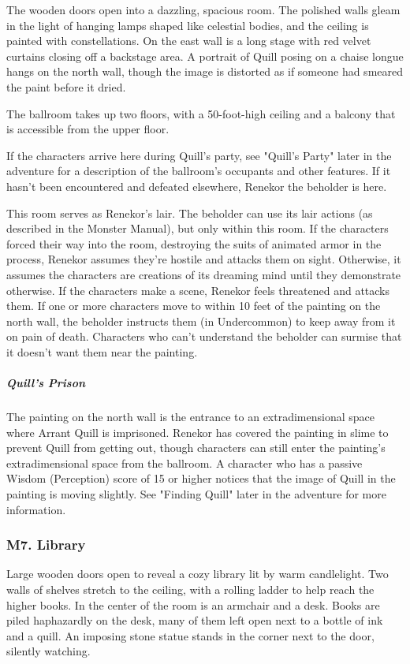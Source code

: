\documentclass[10pt,a4paper,twoside,bg=print,twocolumn,openany,nodeprecatedcode]{dndbook}
\begin{document}
\begin{DndReadAloud}{}
The wooden doors open into a dazzling, spacious room. The polished walls gleam in the light of hanging lamps shaped like celestial bodies, and the ceiling is painted with constellations. On the east wall is a long stage with red velvet curtains closing off a backstage area. A portrait of Quill posing on a chaise longue hangs on the north wall, though the image is distorted as if someone had smeared the paint before it dried.

\end{DndReadAloud}

The ballroom takes up two floors, with a 50-foot-high ceiling and a balcony that is accessible from the upper floor.

If the characters arrive here during Quill's party, see "Quill's Party" later in the adventure for a description of the ballroom's occupants and other features. If it hasn't been encountered and defeated elsewhere, Renekor the beholder is here.

This room serves as Renekor's lair. The beholder can use its lair actions (as described in the Monster Manual), but only within this room. If the characters forced their way into the room, destroying the suits of animated armor in the process, Renekor assumes they're hostile and attacks them on sight. Otherwise, it assumes the characters are creations of its dreaming mind until they demonstrate otherwise. If the characters make a scene, Renekor feels threatened and attacks them. If one or more characters move to within 10 feet of the painting on the north wall, the beholder instructs them (in Undercommon) to keep away from it on pain of death. Characters who can't understand the beholder can surmise that it doesn't want them near the painting.

\subparagraph{Quill's Prison}
The painting on the north wall is the entrance to an extradimensional space where Arrant Quill is imprisoned. Renekor has covered the painting in slime to prevent Quill from getting out, though characters can still enter the painting's extradimensional space from the ballroom. A character who has a passive Wisdom (Perception) score of 15 or higher notices that the image of Quill in the painting is moving slightly. See "Finding Quill" later in the adventure for more information.

\subsubsection{M7. Library}
\begin{DndReadAloud}{}
Large wooden doors open to reveal a cozy library lit by warm candlelight. Two walls of shelves stretch to the ceiling, with a rolling ladder to help reach the higher books. In the center of the room is an armchair and a desk. Books are piled haphazardly on the desk, many of them left open next to a bottle of ink and a quill. An imposing stone statue stands in the corner next to the door, silently watching.

\end{DndReadAloud}
\end{document}
